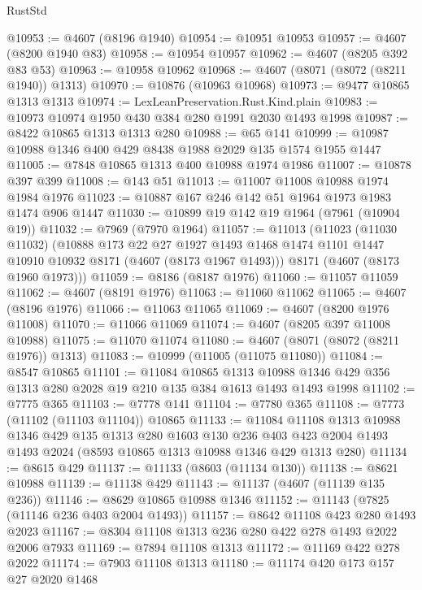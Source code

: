\begin{lexlean}{RustStd}
\begin{coremodule}
@10953 := @4607 (@8196 @1940)
@10954 := @10951 @10953
@10957 := @4607 (@8200 @1940 @83)
@10958 := @10954 @10957
@10962 := @4607 (@8205 @392 @83 @53)
@10963 := @10958 @10962
@10968 := @4607 (@8071 (@8072 (@8211 @1940)) @1313)
@10970 := @10876 (@10963 @10968)
@10973 := @9477 @10865 @1313 @1313
@10974 := LexLeanPreservation.Rust.Kind.plain
@10983 := @10973 @10974 @1950 @430 @384 @280 @1991 @2030 @1493 @1998
@10987 := @8422 @10865 @1313 @1313 @280
@10988 := @65 @141
@10999 := @10987 @10988 @1346 @400 @429 @8438 @1988 @2029 @135 @1574 @1955 @1447
@11005 := @7848 @10865 @1313 @400 @10988 @1974 @1986
@11007 := @10878 @397 @399
@11008 := @143 @51
@11013 := @11007 @11008 @10988 @1974 @1984 @1976
@11023 := @10887 @167 @246 @142 @51 @1964 @1973 @1983 @1474 @906 @1447
@11030 := @10899 @19 @142 @19 @1964 (@7961 (@10904 @19))
@11032 := @7969 (@7970 @1964)
@11057 := @11013
    (@11023
      (@11030 @11032)
      (@10888
        @173
        @22
        @27
        @1927
        @1493
        @1468
        @1474
        @1101
        @1447
        @10910
        @10932
        @8171
        (@4607 (@8173 @1967 @1493)))
      @8171
      (@4607 (@8173 @1960 @1973)))
@11059 := @8186 (@8187 @1976)
@11060 := @11057 @11059
@11062 := @4607 (@8191 @1976)
@11063 := @11060 @11062
@11065 := @4607 (@8196 @1976)
@11066 := @11063 @11065
@11069 := @4607 (@8200 @1976 @11008)
@11070 := @11066 @11069
@11074 := @4607 (@8205 @397 @11008 @10988)
@11075 := @11070 @11074
@11080 := @4607 (@8071 (@8072 (@8211 @1976)) @1313)
@11083 := @10999 (@11005 (@11075 @11080))
@11084 := @8547 @10865
@11101 := @11084
    @10865
    @1313
    @10988
    @1346
    @429
    @356
    @1313
    @280
    @2028
    @19
    @210
    @135
    @384
    @1613
    @1493
    @1493
    @1998
@11102 := @7775 @365
@11103 := @7778 @141
@11104 := @7780 @365
@11108 := @7773 (@11102 (@11103 @11104)) @10865
@11133 := @11084
    @11108
    @1313
    @10988
    @1346
    @429
    @135
    @1313
    @280
    @1603
    @130
    @236
    @403
    @423
    @2004
    @1493
    @1493
    @2024
    (@8593 @10865 @1313 @10988 @1346 @429 @1313 @280)
@11134 := @8615 @429
@11137 := @11133 (@8603 (@11134 @130))
@11138 := @8621 @10988
@11139 := @11138 @429
@11143 := @11137 (@4607 (@11139 @135 @236))
@11146 := @8629 @10865 @10988 @1346
@11152 := @11143 (@7825 (@11146 @236 @403 @2004 @1493))
@11157 := @8642 @11108 @423 @280 @1493 @2023
@11167 := @8304 @11108 @1313 @236 @280 @422 @278 @1493 @2022 @2006 @7933
@11169 := @7894 @11108 @1313
@11172 := @11169 @422 @278 @2022
@11174 := @7903 @11108 @1313
@11180 := @11174 @420 @173 @157 @27 @2020 @1468

\end{coremodule}
\end{lexlean}

